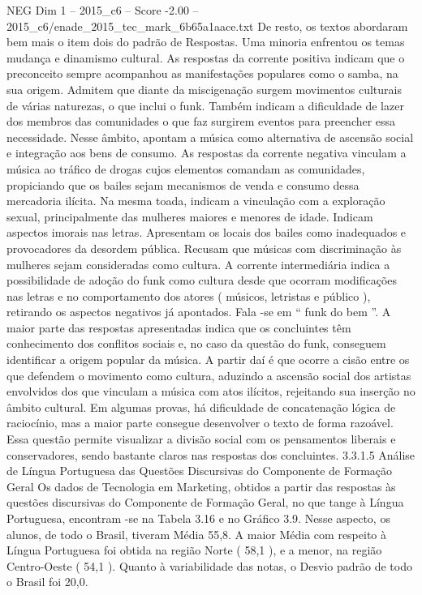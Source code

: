 \begin{textsample}{NEG Dim 1 – 2015\_c6 – Score -2.00 – 2015\_c6/enade\_2015\_tec\_mark\_6b65a1aace.txt}
De resto, os textos abordaram bem mais o item dois do padrão de Respostas.
Uma minoria enfrentou os temas mudança e dinamismo cultural.
As respostas da corrente positiva indicam que o preconceito sempre acompanhou as manifestações populares como o samba, na sua origem.
Admitem que diante da miscigenação surgem movimentos culturais de várias naturezas, o que inclui o funk.
Também indicam a dificuldade de lazer dos membros das comunidades o que faz surgirem eventos para preencher essa necessidade.
Nesse âmbito, apontam a música como alternativa de ascensão social e integração aos bens de consumo.
As respostas da corrente negativa vinculam a música ao tráfico de drogas cujos elementos comandam as comunidades, propiciando que os bailes sejam mecanismos de venda e consumo dessa mercadoria ilícita.
Na mesma toada, indicam a vinculação com a exploração sexual, principalmente das mulheres maiores e menores de idade.
Indicam aspectos imorais nas letras.
Apresentam os locais dos bailes como inadequados e provocadores da desordem pública.
Recusam que músicas com discriminação às mulheres sejam consideradas como cultura.
A corrente intermediária indica a possibilidade de adoção do funk como cultura desde que ocorram modificações nas letras e no comportamento dos atores ( músicos, letristas e público ), retirando os aspectos negativos já apontados.
Fala -se em “ funk do bem ”.
A maior parte das respostas apresentadas indica que os concluintes têm conhecimento dos conflitos sociais e, no caso da questão do funk, conseguem identificar a origem popular da música.
A partir daí é que ocorre a cisão entre os que defendem o movimento como cultura, aduzindo a ascensão social dos artistas envolvidos dos que vinculam a música com atos ilícitos, rejeitando sua inserção no âmbito cultural.
Em algumas provas, há dificuldade de concatenação lógica de raciocínio, mas a maior parte consegue desenvolver o texto de forma razoável.
Essa questão permite visualizar a divisão social com os pensamentos liberais e conservadores, sendo bastante claros nas respostas dos concluintes. 3.3.1.5 Análise de Língua Portuguesa das Questões Discursivas do Componente de Formação Geral Os dados de Tecnologia em Marketing, obtidos a partir das respostas às questões discursivas do Componente de Formação Geral, no que tange à Língua Portuguesa, encontram -se na Tabela 3.16 e no Gráfico 3.9.
Nesse aspecto, os alunos, de todo o Brasil, tiveram Média 55,8.
A maior Média com respeito à Língua Portuguesa foi obtida na região Norte ( 58,1 ), e a menor, na região Centro-Oeste ( 54,1 ).
Quanto à variabilidade das notas, o Desvio padrão de todo o Brasil foi 20,0.

\end{textsample}
